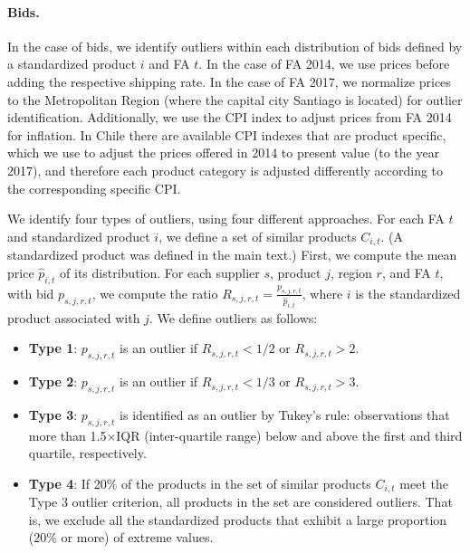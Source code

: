 \paragraph{Bids.}  In the case of bids, we identify outliers within each distribution of bids defined by a standardized product $i$ and FA $t$. In the case of FA 2014, we use prices before adding the respective shipping rate. In the case of FA 2017, we normalize prices to the Metropolitan Region (where the capital city Santiago is located) for outlier identification. Additionally, we use the CPI index to adjust prices from FA 2014 for inflation. In Chile there are available CPI indexes that are product specific, which we use to adjust the prices offered in 2014 to present value (to the year 2017), and therefore each product category is adjusted differently according to the corresponding specific CPI. 

We identify four types of outliers, using four different approaches. For each FA $t$ and standardized product $i$, we define a set of similar products $C_{i,t}$. (A standardized product was defined in the main text.) First, we compute the mean price $\hat{p}_{i,t}$ of its distribution. For each supplier $s$, product $j$, region $r$, and FA $t$, with bid $p_{s,j,r,t}$, we compute the ratio $R_{s,j,r,t} = \frac{p_{s,j,r,t}}{\hat{p}_{i,t}}$, where $i$ is the standardized product associated with $j$. We define outliers as follows:

\begin{itemize}
\item[] \textbf{Type 1}: $p_{s,j,r,t}$ is an outlier if $R_{s,j,r,t}<1/2$ or $R_{s,j,r,t}>2$.
\item[] \textbf{Type 2}: $p_{s,j,r,t}$ is an outlier if $R_{s,j,r,t}<1/3$ or $R_{s,j,r,t}>3$.
\item[] \textbf{Type 3}: $p_{s,j,r,t}$ is identified as an outlier by Tukey's rule: observations that more than 1.5$\times$IQR (inter-quartile range) below and above the first and third quartile, respectively.
\item[] \textbf{Type 4}: If 20\% of the products in the set of similar products $C_{i,t}$ meet the Type 3 outlier criterion, all products in the set are considered outliers. That is, we exclude all the standardized products that exhibit a large proportion (20\% or more) of extreme values.%
\end{itemize}

